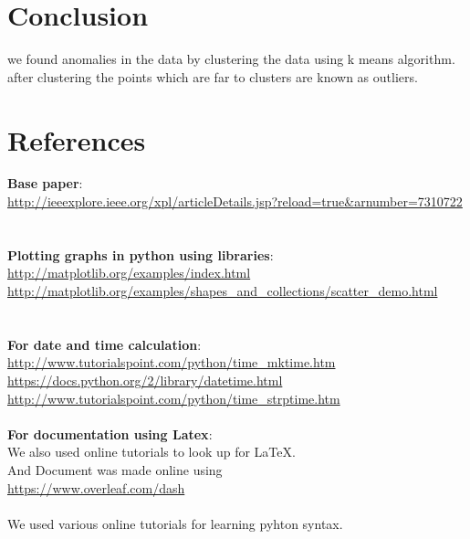 \documentclass[12pt]{report}
\begin{document}
\newpage
\section*{Conclusion}

we found anomalies in the data by clustering the data using k means algorithm. after clustering the points which are far to clusters are known as outliers.


\section*{References}
\textbf{Base paper}:\\
\url{http://ieeexplore.ieee.org/xpl/articleDetails.jsp?reload=true&arnumber=7310722}\\
\\\\
\textbf{ Plotting graphs in python using libraries}:\\
\url{http://matplotlib.org/examples/index.html}\\
\url{http://matplotlib.org/examples/shapes_and_collections/scatter_demo.html}\\
\\\\
\textbf{For date and time calculation}:\\
\url{http://www.tutorialspoint.com/python/time_mktime.htm}\\
\url{https://docs.python.org/2/library/datetime.html}\\
\url{http://www.tutorialspoint.com/python/time_strptime.htm}
\\\\
\textbf{For documentation using Latex}:\\
We also used online tutorials to look up for LaTeX.\\
And Document was made online using\\
\url{https://www.overleaf.com/dash}\\
\\
We used various online tutorials for learning pyhton syntax.\\
\end{document}
